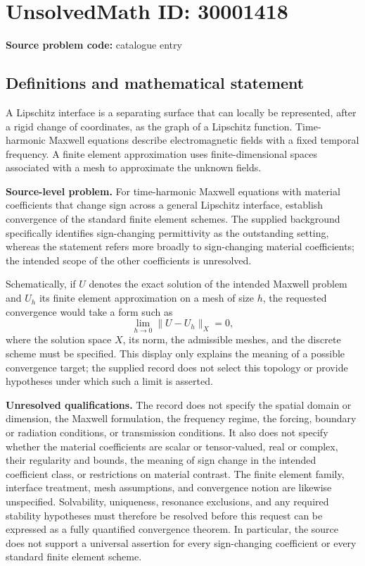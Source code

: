 \documentclass[11pt]{article}
\begin{document}
\section*{UnsolvedMath ID: 30001418}
\textbf{Source problem code:} catalogue entry
\subsection{Definitions and mathematical statement}
A Lipschitz interface is a separating surface that can locally be represented, after a rigid change of coordinates, as the graph of a Lipschitz function. Time-harmonic Maxwell equations describe electromagnetic fields with a fixed temporal frequency. A finite element approximation uses finite-dimensional spaces associated with a mesh to approximate the unknown fields.

\textbf{Source-level problem.} For time-harmonic Maxwell equations with material coefficients that change sign across a general Lipschitz interface, establish convergence of the standard finite element schemes. The supplied background specifically identifies sign-changing permittivity as the outstanding setting, whereas the statement refers more broadly to sign-changing material coefficients; the intended scope of the other coefficients is unresolved.

Schematically, if \(U\) denotes the exact solution of the intended Maxwell problem and \(U_h\) its finite element approximation on a mesh of size \(h\), the requested convergence would take a form such as
\[
\lim_{h\to 0}\|U-U_h\|_X=0,
\]
where the solution space \(X\), its norm, the admissible meshes, and the discrete scheme must be specified. This display only explains the meaning of a possible convergence target; the supplied record does not select this topology or provide hypotheses under which such a limit is asserted.

\textbf{Unresolved qualifications.} The record does not specify the spatial domain or dimension, the Maxwell formulation, the frequency regime, the forcing, boundary or radiation conditions, or transmission conditions. It also does not specify whether the material coefficients are scalar or tensor-valued, real or complex, their regularity and bounds, the meaning of sign change in the intended coefficient class, or restrictions on material contrast. The finite element family, interface treatment, mesh assumptions, and convergence notion are likewise unspecified. Solvability, uniqueness, resonance exclusions, and any required stability hypotheses must therefore be resolved before this request can be expressed as a fully quantified convergence theorem. In particular, the source does not support a universal assertion for every sign-changing coefficient or every standard finite element scheme.
\end{document}
